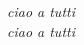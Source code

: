 \begin{center}
\newpage
\hfill  \textit{ciao a tutti}\\
\hfill \textit{ciao a tutti}\\
\newpage
\end{center}